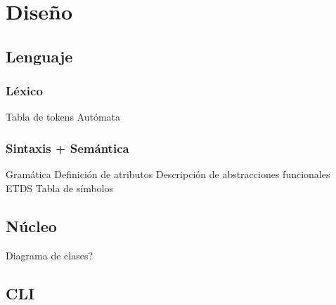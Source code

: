 \chapter{Diseño}

\section{Lenguaje}
\subsection{Léxico}
Tabla de tokens
Autómata

\subsection{Sintaxis + Semántica}
Gramática
Definición de atributos
Descripción de abstracciones funcionales
ETDS
Tabla de símbolos


\section{Núcleo}
Diagrama de clases?


\section{CLI}